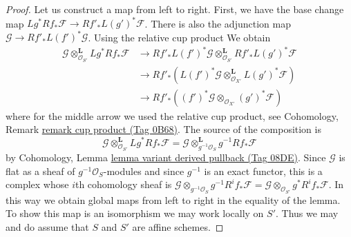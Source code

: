 \documentclass{amsart}
\theoremstyle{plain}
\theoremstyle{definition}
\theoremstyle{remark}
\numberwithin{equation}{subsection}
\begin{document}
\begin{proof}
Let us construct a map from left to right. First, we have the base change map
$Lg^*Rf_*\mathcal{F} \to Rf'_*L(g')^*\mathcal{F}$. There is also the adjunction
map $\mathcal{G} \to Rf'_*L(f')^*\mathcal{G}$. Using the relative cup product
We obtain
\begin{align*}
\mathcal{G}
\otimes_{\mathcal{O}_{S'}}^\mathbf{L}
Lg^*Rf_*\mathcal{F}
& \to
Rf'_*L(f')^*\mathcal{G}
\otimes_{\mathcal{O}_{S'}}^\mathbf{L}
Rf'_*L(g')^*\mathcal{F} \\
& \to
Rf'_*\left(L(f')^*\mathcal{G}
\otimes_{\mathcal{O}_{X'}}^\mathbf{L}
L(g')^*\mathcal{F}\right) \\
& \to
Rf'_*\left((f')^*\mathcal{G}
\otimes_{\mathcal{O}_{X'}} (g')^*\mathcal{F}\right)
\end{align*}
where for the middle arrow we used the relative cup product, see
Cohomology, Remark \href{https://stacks.math.columbia.edu/tag/0B68}{remark cup product (Tag 0B68)}.
The source of the composition is
$$
\mathcal{G} \otimes_{\mathcal{O}_{S'}}^\mathbf{L} Lg^*Rf_*\mathcal{F} =
\mathcal{G} \otimes_{g^{-1}\mathcal{O}_S}^\mathbf{L} g^{-1}Rf_*\mathcal{F}
$$
by Cohomology, Lemma \href{https://stacks.math.columbia.edu/tag/08DE}{lemma variant derived pullback (Tag 08DE)}.
Since $\mathcal{G}$ is flat as a sheaf of $g^{-1}\mathcal{O}_S$-modules
and since $g^{-1}$ is an exact functor, this is a complex whose
$i$th cohomology sheaf is
$\mathcal{G} \otimes_{g^{-1}\mathcal{O}_S} g^{-1}R^if_*\mathcal{F} =
\mathcal{G} \otimes_{\mathcal{O}_{S'}} g^*R^if_*\mathcal{F}$.
In this way we obtain global maps from left to right in the
equality of the lemma. To show this map is an isomorphism we may
work locally on $S'$. Thus we may and do assume that $S$ and $S'$
are affine schemes.


\end{proof}
\end{document}
